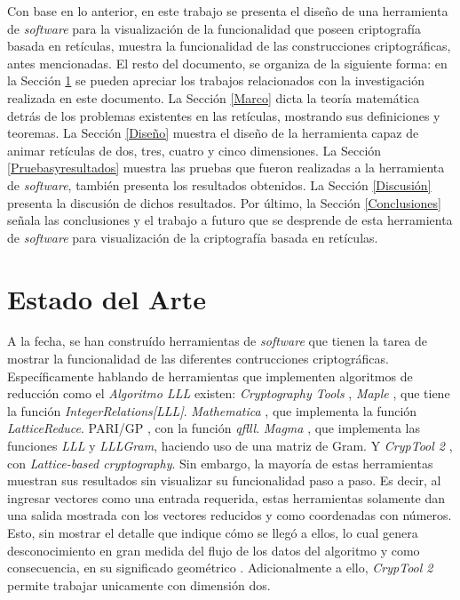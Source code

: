 \documentclass{llncs}
\begin{document}
Con base en lo anterior, en este trabajo se presenta el diseño de una herramienta de \textit{software} para la visualización de la funcionalidad que poseen criptografía basada en retículas, muestra la funcionalidad de las construcciones criptogr\'aficas, antes mencionadas. El resto del documento, se organiza de la siguiente forma: en la Secci\'on \ref{Estado} se pueden apreciar los trabajos relacionados con la investigaci\'on realizada en este documento. La Secci\'on \ref{Marco} dicta la teor\'ia matem\'atica detr\'as de los problemas existentes en las ret\'iculas, mostrando sus definiciones y teoremas. La Secci\'on \ref{Diseño} muestra el diseño de la herramienta capaz de animar ret\'iculas de dos, tres, cuatro y cinco dimensiones. La Secci\'on \ref{Pruebasyresultados} muestra las pruebas que fueron realizadas a la herramienta de \textit{software}, también presenta los resultados obtenidos. La Secci\'on \ref{Discusión} presenta la discusión de dichos resultados. Por \'ultimo, la Secci\'on \ref{Conclusiones} señala las conclusiones y el trabajo a futuro que se desprende de esta herramienta de \textit{software} para visualización de la criptografía basada en retículas.

\section{Estado del Arte}
\label{Estado}
A la fecha, se han constru\'ido herramientas de \textit{software} que tienen la tarea de mostrar la funcionalidad de las diferentes contrucciones criptogr\'aficas.\\ %
Espec\'ificamente hablando de herramientas que implementen algoritmos de reducci\'on como el \textit{Algoritmo LLL} existen: \textit{Cryptography Tools} \cite{b4}, \textit{Maple} \cite{b5}, que tiene la funci\'on \textit{IntegerRelations[LLL]}. \textit{Mathematica} \cite{b6}, que implementa la funci\'on \textit{LatticeReduce}. PARI/GP \cite{b7}, con la funci\'on \textit{qflll}. \textit{Magma} \cite{b8}, que implementa las funciones \textit{LLL} y \textit{LLLGram}, haciendo uso de una matriz de Gram. Y \textit{CrypTool 2} \cite{b9}, con \textit{Lattice-based cryptography}. Sin embargo, la mayor\'ia de estas herramientas muestran sus resultados sin visualizar su funcionalidad paso a paso. Es decir, al ingresar vectores como una entrada requerida, estas herramientas solamente dan una salida mostrada con los vectores reducidos y como coordenadas con n\'umeros. Esto, sin mostrar el detalle que indique c\'omo se llegó a ellos, lo cual genera desconocimiento en gran medida del flujo de los datos del algoritmo y como consecuencia, en su significado geom\'etrico \cite{b10}. Adicionalmente a ello, \textit{CrypTool 2} \cite{b9} permite trabajar unicamente con dimensi\'on dos. 
\end{document}
